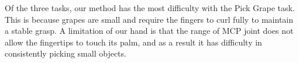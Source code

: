 Of the three tasks, our method has the most difficulty with the Pick Grape task. This is because grapes are small and require the fingers to curl fully to maintain a stable grasp. A limitation of our hand is that the range of MCP joint does not allow the fingertips to touch its palm, and as a result it has difficulty in consistently picking small objects.

